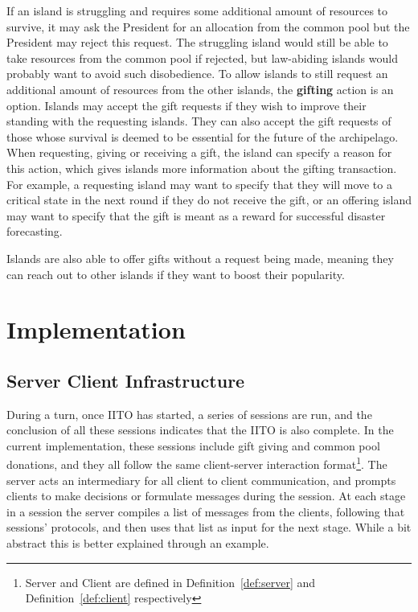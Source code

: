 If an island is struggling and requires some additional amount of resources to survive, it may ask the President for an allocation from the common pool but the President may reject this request. The struggling island would still be able to take resources from the common pool if rejected, but law-abiding islands would probably want to avoid such disobedience. To allow islands to still request an additional amount of resources from the other islands, the \textbf{gifting} action is an option. Islands may accept the gift requests if they wish to improve their standing with the requesting islands. They can also accept the gift requests of those whose survival is deemed to be essential for the future of the archipelago. When requesting, giving or receiving a gift, the island can specify a reason for this action, which gives islands more information about the gifting transaction. For example, a requesting island may want to specify that they will move to a critical state in the next round if they do not receive the gift, or an offering island may want to specify that the gift is meant as a reward for successful disaster forecasting.

Islands are also able to offer gifts without a request being made, meaning they can reach out to other islands if they want to boost their popularity.

\section{Implementation}
\label{sec:IITO:Implementation}

\subsection{Server Client Infrastructure}
\label{subsec:IITO:server_client_infrastructure}  

During a turn, once IITO has started, a series of sessions are run, and the conclusion of all these sessions indicates that the IITO is also complete. In the current implementation, these sessions include gift giving and common pool donations, and they all follow the same client-server interaction format\footnote{Server and Client are defined in Definition~\ref{def:server} and Definition~\ref{def:client} respectively}. The server acts an intermediary for all client to client communication, and prompts clients to make decisions or formulate messages during the session. At each stage in a session the server compiles a list of messages from the clients, following that sessions' protocols, and then uses that list as input for the next stage. While a bit abstract this is better explained through an example.

